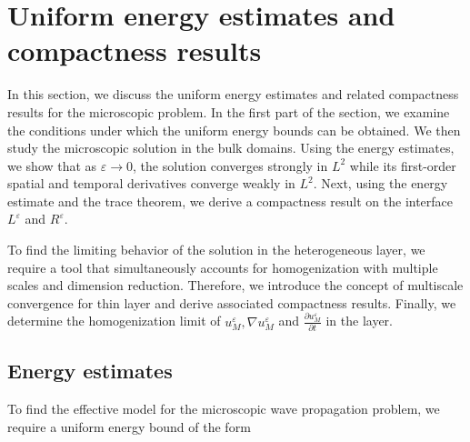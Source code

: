 \documentclass[11pt]{article}
\def\es{\varepsilon}
\def\orr{\Omega_R^\varepsilon}
\def\oll{\Omega_L^\varepsilon}
\def\p{\partial}
\newcommand{\B}{\textcolor{orange}}
\begin{document}
 
 \section{Uniform energy estimates and compactness results}\label{section:Uniform energy estimates and compactness results}

 In this section, we discuss the uniform energy estimates and related compactness results for the microscopic problem. In the first part of the section, we examine the conditions under which the uniform energy bounds can be obtained.  We then study the microscopic solution in the bulk domains. Using the energy estimates, we show that as  $\es\rightarrow 0$, the solution converges strongly in $L^2$ while its first-order spatial and temporal derivatives converge weakly in $L^2$.
%
 Next, using the energy estimate and the trace theorem, we derive a compactness result on the interface $L^\es$ and $R^\es$.  

 To find the limiting behavior of the solution in the heterogeneous layer, we require a tool that simultaneously accounts for homogenization with multiple  scales and dimension reduction. Therefore, we introduce the concept of multiscale convergence for thin layer and derive associated compactness results.   Finally, we determine the homogenization limit of $u_M^\es, \nabla u_M^\es$ and $\frac{\p  u_M^\es}{\p t}$ in the layer.


 

\subsection{Energy estimates}
To find the effective model for the microscopic wave propagation problem, we require a uniform energy bound of the form
\end{document}

